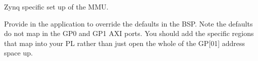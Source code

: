 Zynq specific set up of the M\+MU. 

Provide in the application to override the defaults in the B\+SP. Note the defaults do not map in the G\+P0 and G\+P1 A\+XI ports. You should add the specific regions that map into your PL rather than just open the whole of the GP\mbox{[}01\mbox{]} address space up. 